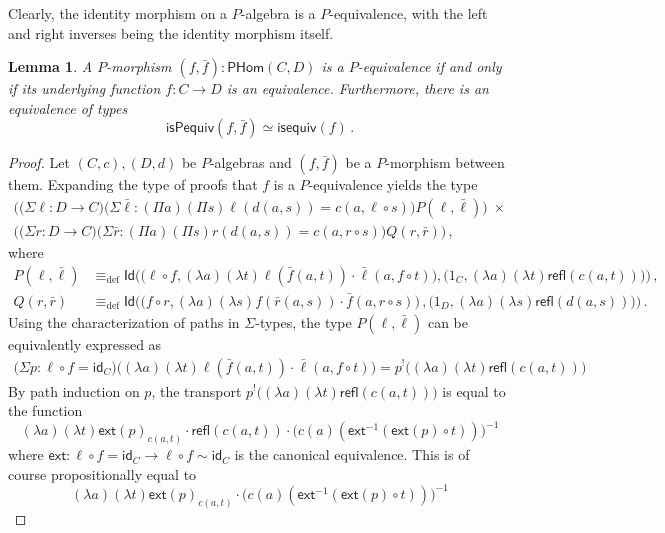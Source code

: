 \documentclass[reqno,10pt,a4paper,oneside]{amsart}
\numberwithin{equation}{section}
\theoremstyle{mythm}
\newtheorem{lemma}[theorem]{Lemma}
\theoremstyle{mydef}
\theoremstyle{myrmk}
\newcommand{\deq}{\equiv}
\newcommand{\defeq}{\deq_{\mathrm{def}}}
\newcommand{\co}{\colon}
\newcommand{\idfun}[1]{\mathsf{id}_{#1}}
\newcommand{\comp}{\circ}
\newcommand{\ext}{\mathsf{ext}}
\newcommand{\ct}{\cdot}
\newcommand{\Id}{\mathsf{Id}}
\newcommand{\refl}{\mathsf{refl}}
\newcommand{\WHom}{\mathsf{PHom}}
\begin{document}
Clearly, the identity morphism on a $P$-algebra is a $P$-equivalence, with the left and right inverses being the identity morphism itself.

\begin{lemma}\label{WAlgSpace} A $P$-morphism $(f, \bar{f}) \co \WHom(C,D)$ is a $P$-equivalence if and only
if its underlying function $f \co C \to D$ is an equivalence. Furthermore, there is an equivalence of types
\[
\mathsf{isPequiv}(f, \bar{f})  \simeq \mathsf{isequiv}(f) \, . 
\]
\end{lemma}  
\begin{proof}
Let $(C,c), (D,d)$ be $P$-algebras and $(f, \bar{f})$ be a $P$-morphism between them. Expanding the type of proofs that $f$ is a $P$-equivalence yields the type
\begin{multline*}
 \Big(\big(\Sigma \ell \co D \to  C \big) \big(\Sigma \bar{\ell} : (\Pi a) (\Pi s) \ell(d(a,s))=c(a,\ell \circ s)\big)
P(\ell,\bar{\ell})\Big) \; \times \\ 
 \Big(\big(\Sigma r \co D \to C \big) \big(\Sigma \bar{r} : (\Pi a) (\Pi s) r(d(a,s))=c(a,r \circ s) \big) Q(r,\bar{r})  \Big)\, , 
\end{multline*}
where
\begin{align*}
P(\ell,\bar{\ell}) & \defeq \Id \Big( \big( \ell \comp f, (\lambda a)(\lambda t) \ell(\bar{f}(a,t)) \ct \bar{\ell}(a, f \comp t)\big), \big( 1_C, (\lambda a)(\lambda t) \refl(c(a,t))\big) \Big)  \, , \\
Q(r,\bar{r})    & \defeq \Id \Big( \big( f \comp r, (\lambda a)(\lambda s) f(\bar{r}(a,s)) \ct \bar{f}(a, r \comp s)\big) \, , \big( 1_D, (\lambda a)(\lambda s) \refl(d(a,s)) \big) \Big) \, .
\end{align*}
Using the characterization of paths in $\Sigma$-types, the type $P(\ell,\bar{\ell})$ can be equivalently expressed as
\begin{align*}
\big(\Sigma p : \ell \comp f = \idfun{C} \big) \Big((\lambda a) (\lambda t) \ell(\bar{f}(a,t)) \ct \bar{\ell}(a, f \comp t)\Big) = p^{!} \Big((\lambda a) (\lambda t) \refl(c(a,t))\Big) 
\end{align*}
By path induction on $p$, the transport $p^{!} \Big((\lambda a) (\lambda t) \refl(c(a,t))\Big)$ is equal to the function
\[ (\lambda a) (\lambda t) \ext(p)_{c(a,t)} \ct \refl(c(a,t)) \ct \big(c(a)(\ext^{-1}(\ext(p) \circ t))\big)^{-1} \]
where $\ext : \ell \comp f = \idfun{C} \to \ell \comp f \sim \idfun{C}$ is the canonical equivalence. This is of course propositionally equal to
\[ (\lambda a) (\lambda t) \ext(p)_{c(a,t)} \ct \big(c(a)(\ext^{-1}(\ext(p) \circ t))\big)^{-1} \]

\end{proof}
\end{document}
